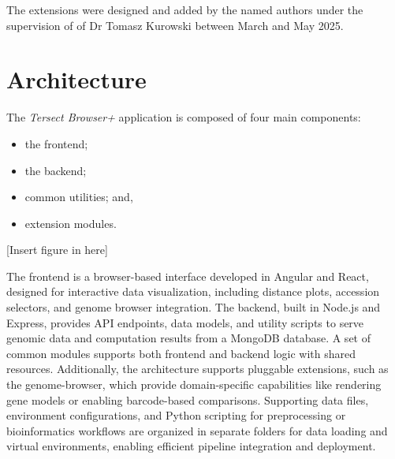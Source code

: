 \documentclass[12pt]{article}
\begin{document}
The extensions were designed and added by the named authors under the supervision of of Dr Tomasz Kurowski between March and May 2025. 


\section{Architecture}
The \textit{Tersect Browser+} application is composed of four main components: 
\begin{itemize}
    \item the frontend; 
    \item the backend; 
    \item common utilities; and, 
    \item extension modules.
\end{itemize} 

[Insert figure in here]

The frontend is a browser-based interface developed in Angular and React, designed for interactive data visualization, including distance plots, accession selectors, and genome browser integration. The backend, built in Node.js and Express, provides API endpoints, data models, and utility scripts to serve genomic data and computation results from a MongoDB database. A set of common modules supports both frontend and backend logic with shared resources. Additionally, the architecture supports pluggable extensions, such as the genome-browser, which provide domain-specific capabilities like rendering gene models or enabling barcode-based comparisons. Supporting data files, environment configurations, and Python scripting for preprocessing or bioinformatics workflows are organized in separate folders for data loading and virtual environments, enabling efficient pipeline integration and deployment.

\end{document}
